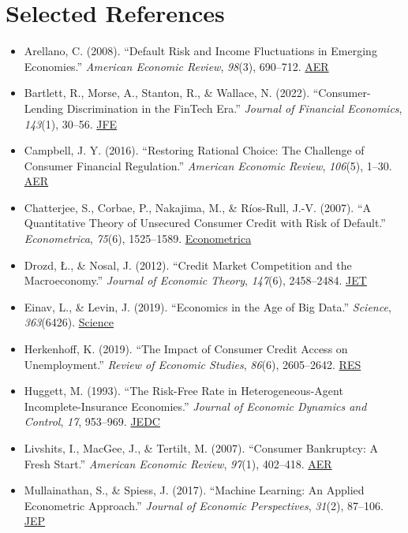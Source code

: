 \documentclass[acmsmall]{acmart}
\begin{document}
\section*{Selected References}

\begin{itemize}
    \item Arellano, C. (2008). “Default Risk and Income Fluctuations in Emerging Economies.” \textit{American Economic Review}, \textit{98}(3), 690–712. \href{https://www.aeaweb.org/articles?id=10.1257/aer.98.3.690}{AER}
    \item Bartlett, R., Morse, A., Stanton, R., \& Wallace, N. (2022). “Consumer-Lending Discrimination in the FinTech Era.” \textit{Journal of Financial Economics}, \textit{143}(1), 30–56. \href{https://www.sciencedirect.com/science/article/pii/S0304405X2100212X}{JFE}
    \item Campbell, J. Y. (2016). “Restoring Rational Choice: The Challenge of Consumer Financial Regulation.” \textit{American Economic Review}, \textit{106}(5), 1–30. \href{https://www.aeaweb.org/articles?id=10.1257/aer.20151213}{AER}
    \item Chatterjee, S., Corbae, P., Nakajima, M., \& Ríos-Rull, J.-V. (2007). “A Quantitative Theory of Unsecured Consumer Credit with Risk of Default.” \textit{Econometrica}, \textit{75}(6), 1525–1589. \href{https://www.econometricsociety.org/publications/econometrica/1999/09/01/quantitative-theory-unsecured-consumer-credit-risk-default}{Econometrica}
    \item Drozd, Ł., \& Nosal, J. (2012). “Credit Market Competition and the Macroeconomy.” \textit{Journal of Economic Theory}, \textit{147}(6), 2458–2484. \href{https://www.sciencedirect.com/science/article/pii/S002205311200082X}{JET}
    \item Einav, L., \& Levin, J. (2019). “Economics in the Age of Big Data.” \textit{Science}, \textit{363}(6426). \href{https://www.science.org/doi/10.1126/science.aav8198}{Science}
    \item Herkenhoff, K. (2019). “The Impact of Consumer Credit Access on Unemployment.” \textit{Review of Economic Studies}, \textit{86}(6), 2605–2642. \href{https://academic.oup.com/restud/article-abstract/86/6/2605/5489438}{RES}
    \item Huggett, M. (1993). “The Risk-Free Rate in Heterogeneous-Agent Incomplete-Insurance Economies.” \textit{Journal of Economic Dynamics and Control}, \textit{17}, 953–969. \href{https://www.sciencedirect.com/science/article/pii/0165188993900407}{JEDC}
    \item Livshits, I., MacGee, J., \& Tertilt, M. (2007). “Consumer Bankruptcy: A Fresh Start.” \textit{American Economic Review}, \textit{97}(1), 402–418. \href{https://www.aeaweb.org/articles?id=10.1257/aer.97.1.402}{AER}
    \item Mullainathan, S., \& Spiess, J. (2017). “Machine Learning: An Applied Econometric Approach.” \textit{Journal of Economic Perspectives}, \textit{31}(2), 87–106. \href{https://www.aeaweb.org/articles?id=10.1257/jep.31.2.87}{JEP}
\end{itemize}
\end{document}
